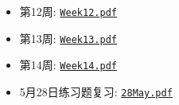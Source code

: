 \documentclass[a4paper,11pt]{article}
\begin{document}
\begin{itemize}
    \vspace{-1em}
    \item {第12周}: \href{https://wanghuaijin.github.io/assets/numDEs/exercises/exercise12.pdf}{\texttt{Week12.pdf}}
    \vspace{-1em}
    \item {第13周}: \href{https://wanghuaijin.github.io/assets/numDEs/exercises/exercise13.pdf}{\texttt{Week13.pdf}}
    \vspace{-1em}
    \item {第14周}: \href{https://wanghuaijin.github.io/assets/numDEs/exercises/exercise14.pdf}{\texttt{Week14.pdf}}
    \vspace{-1em}
    \item {5月28日练习题复习}: \href{https://wanghuaijin.github.io/assets/numDEs/exercises/exerciseReview.pdf}{\texttt{28May.pdf}}
\end{itemize}
\end{document}
